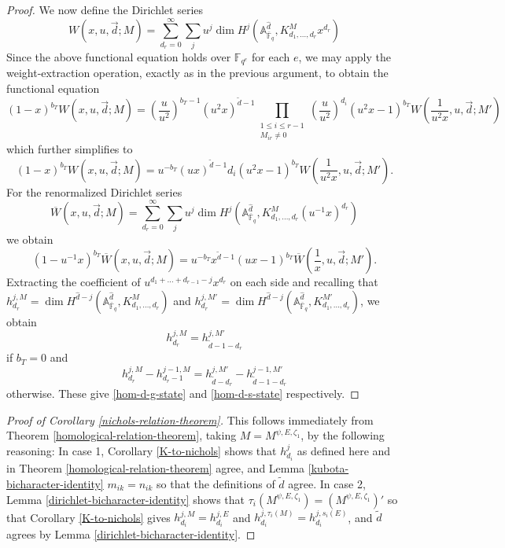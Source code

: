 \documentclass[11pt,letterpaper]{article}
\theoremstyle{definition}
\theoremstyle{remark}
\numberwithin{equation}{section}
\theoremstyle{dotless}
\newcommand{\hchi}{\psi} %
\newcommand{\gene}{\zeta_1} %
\renewcommand{\tilde}{\widetilde}
\begin{document}
\begin{proof}
We now define the Dirichlet series \[W(x, u, \vec{d}; M) = \sum_{d_r=0}^\infty \sum_j u^j \dim H^j ( \mathbb A_{\overline{\mathbb F}_q}^{\hat{d}}, K_{d_1,\dots,d_r}^M x^{d_r})\] 
Since the above functional equation holds over $\mathbb F_{q^e}$ for each $e$, we may apply the weight-extraction operation, exactly as in the previous argument, to obtain the functional equation
\[ (1-x)^{b_T}  W(x, u, \vec{d}; M) =  \left( \frac{u}{u^2} \right)^{b_{T}-1} (u^2 x)^{\tilde{d}-1 } 
\prod_{\substack{1 \leq i \leq r-1 \\ M_{ir} \neq 0}} \left(\frac{u}{u^2}\right)^{d_i} \left( u^2 x-1\right)^{b_{T}} W( \frac{1}{u^2 x}, u, \vec{d}; M') \]
which further simplifies to
\[ (1-x)^{b_T}  W(x, u, \vec{d}; M) =   u^{-b_T}  (u x)^{\tilde{d}-1 } d_i
 \left( u^2 x-1\right)^{b_{T}} W(\frac{1}{u^2 x}, u, \vec{d}; M') .\]
For the renormalized Dirichlet series
 \[\overline{W}(x, u, \vec{d}; M) = \sum_{d_r=0}^\infty \sum_j u^j \dim H^j ( \mathbb A_{\overline{\mathbb F}_q}^{\hat{d}}, K_{d_1,\dots,d_r}^M (u^{-1} x) ^{d_r})\] 
we obtain
\[ (1-u^{-1} x)^{b_T}  \overline{W} (x, u, \vec{d}; M) =   u^{-b_T}  x^{\tilde{d}-1 } 
  \left( u x-1\right)^{b_{T}} \overline{W} (\frac{1}{x} , u, \vec{d}; M') .\]
Extracting the coefficient of $u^{d_1+\dots + d_{r-1} - j} x^{d_r}$ on each side and recalling that $h^{j,M}_{d_r} =  \dim H^{\hat{d}-j} ( \mathbb A^{\hat{d} }_{\overline{\mathbb F}_q}, K_{d_1,\dots, d_r}^M ) $ and $h^{j,M' }_{d_r} =  \dim H^{\hat{d}-j} ( \mathbb A^{\hat{d} }_{\overline{\mathbb F}_q}, K_{d_1,\dots, d_r}^{M'} ) $, we obtain
\[ h^{j,M}_{d_r}=  h^{j, M'}_{ \tilde{d}-1-d_r}\]
if $b_T=0$ and
\[ h^{j,M}_{d_r} - h^{j-1,M}_{d_r-1} = h^{j, M'}_{ \tilde{d}-d_r} -h^{j-1, M'}_{ \tilde{d}-1- d_r}\]
otherwise. These give \eqref{hom-d-g-state} and \eqref{hom-d-s-state} respectively.
\end{proof}



\begin{proof}[Proof of Corollary \ref{nichols-relation-theorem}] This follows immediately from Theorem \ref{homological-relation-theorem}, taking $M= M^{ \hchi, E,\gene}$, by the following reasoning: In case 1, Corollary \ref{K-to-nichols} shows that $h^j_{d_i}$ as defined here and in Theorem \ref{homological-relation-theorem} agree, and Lemma \ref{kubota-bicharacter-identity} $m_{ik}=n_{ik}$ so that the definitions of $\tilde{d}$ agree.  In case 2, Lemma \ref{dirichlet-bicharacter-identity} shows that $ \tau_i(M^{\hchi,E,\gene}) = (M^{\hchi,E,\gene})'$ so that Corollary \ref{K-to-nichols} gives $h^{j,M}_{d_i}= h^{j,E}_{d_i}$ and $h^{j,\tau_i(M)}_{d_i}= h^{j,s_i(E)}_{d_i}$, and $\tilde{d}$ agrees by Lemma \ref{dirichlet-bicharacter-identity}.\end{proof}
\end{document}
